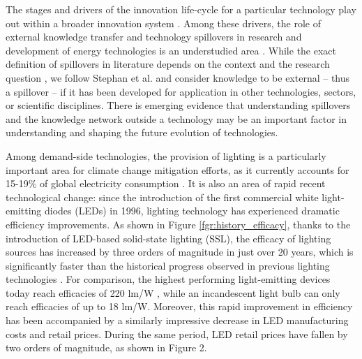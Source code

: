 \documentclass[twoside,twocolumn,9pt]{article}
\begin{document}
 
The stages and drivers of the innovation life-cycle for a particular technology play out within a broader innovation system \cite{grubler2012policies}\cite{Anadon2016}. Among these drivers, the role of external  knowledge transfer and technology spillovers in research and development of energy technologies is an understudied area  \cite{Stephan2021}. While the exact definition of spillovers in literature depends on the context and the research question \cite{Liu2003}\cite{Nemet2012}, we follow Stephan et al. \cite{Stephan2021} and consider knowledge to be external – thus a spillover –  if it has been developed for application in other technologies, sectors, or scientific disciplines. There is emerging evidence that understanding spillovers and the knowledge network outside a technology may be an important factor in understanding \cite{Pichler2020} and shaping \cite{Clark2016}\cite{Stephan2021}\cite{Sun2021}\cite{kolesnikov_framework_2022} the future evolution of technologies.  


Among demand-side technologies, the provision of lighting is a particularly important area for climate change mitigation efforts, as it currently  accounts for 15-19\% of global electricity consumption \cite{Zissis2016}\cite{doe_electricity}. It is also an area of rapid recent technological change: since the introduction of the first commercial white light-emitting diodes (LEDs) in 1996, lighting technology has experienced dramatic efficiency improvements. As shown in Figure \ref{fgr:history_efficacy}, thanks to the introduction of LED-based solid-state lighting (SSL), the efficacy of lighting sources has increased by three orders of magnitude in just over 20 years, which is significantly faster than the historical progress observed in previous lighting technologies \cite{weinold2021quantifying}. For comparison, the highest performing light-emitting devices today reach efficacies of 220 lm/W \cite{lumistrips2021mid}, while an incandescent light bulb can only reach efficacies of up to 18 lm/W. Moreover, this rapid improvement in efficiency has been accompanied by a similarly impressive decrease in LED manufacturing costs and retail prices. During the same period, LED retail prices have fallen by two orders of magnitude, as shown in Figure 2.  
\end{document}
